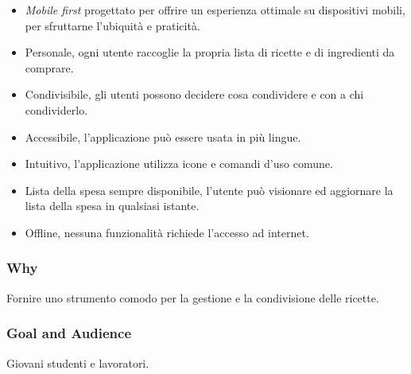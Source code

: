 \begin{itemize}

  \item \textit{Mobile first} progettato per offrire un esperienza ottimale su dispositivi mobili, per sfruttarne l'ubiquità e praticità.

  \item Personale, ogni utente raccoglie la propria lista di ricette e di ingredienti da comprare.

  \item Condivisibile, gli utenti possono decidere cosa condividere e con a chi  condividerlo.

  \item Accessibile, l'applicazione può essere usata in più lingue.

  \item Intuitivo, l'applicazione utilizza icone e comandi d'uso comune.

  \item Lista della spesa sempre disponibile, l'utente può visionare ed aggiornare la lista della spesa in qualsiasi istante.

  \item Offline, nessuna funzionalità richiede l'accesso ad internet.

\end{itemize}

\subsubsection{Why}
Fornire uno strumento comodo per la gestione e la condivisione delle ricette.

\subsubsection{Goal and Audience}
Giovani studenti e lavoratori.

